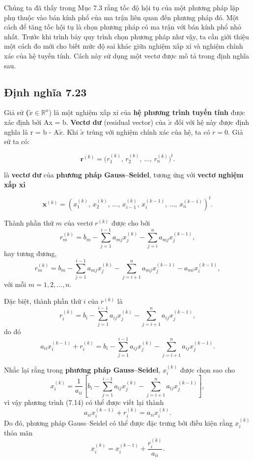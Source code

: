 Chúng ta đã thấy trong Mục 7.3 rằng tốc độ hội tụ của một phương pháp lặp phụ thuộc vào bán kính phổ của ma trận liên quan đến phương pháp đó. Một cách để tăng tốc hội tụ là chọn phương pháp có ma trận với bán kính phổ nhỏ nhất. Trước khi trình bày quy trình chọn phương pháp như vậy, ta cần giới thiệu một cách đo mới cho biết mức độ sai khác giữa nghiệm xấp xỉ và nghiệm chính xác của hệ tuyến tính. Cách này sử dụng một vectơ được mô tả trong định nghĩa sau.

\subsection*{Định nghĩa 7.23}
Giả sử \textbf(\( \tilde{x} \in \mathbb{R}^n \)) là một nghiệm xấp xỉ của \textbf{hệ phương trình tuyến tính} được xác định bởi Ax = b.
\textbf{Vectơ dư} (residual vector) của \( \tilde{x} \) đối với hệ này được định nghĩa là r = b - A\( \tilde{x} \). Khi \( \tilde{x} \) trùng với nghiệm chính xác của hệ, ta có \( r = 0 \). Giả sử ta có:

\[
\mathbf{r}^{(k)} = \bigl(r^{(k)}_{1},\, r^{(k)}_{2},\, \ldots,\, r^{(k)}_{n}\bigr)^{t}.
\]

là \textbf{vectơ dư} của \textbf{phương pháp Gauss--Seidel}, tương ứng với \textbf{vectơ nghiệm xấp xỉ}

\[
\mathbf{x}^{(k)} = (x^{(k)}_1,\, x^{(k)}_2,\, \ldots,\, x^{(k)}_{i-1},\, x^{(k-1)}_i,\, \ldots,\, x^{(k-1)}_n)^{t}.
\]

Thành phần thứ \( m \) của vectơ \( r^{(k)} \) được cho bởi
\[
r^{(k)}_m = b_m - \sum_{j=1}^{i-1} a_{mj} x^{(k)}_j - \sum_{j=i}^{n} a_{mj} x^{(k-1)}_j, \tag{7.13}
\]
hay tương đương,
\[
r^{(k)}_m = b_m - \sum_{j=1}^{i-1} a_{mj} x^{(k)}_j - \sum_{j=i+1}^{n} a_{mj} x^{(k-1)}_j - a_{mi}x^{(k-1)}_i,
\]
với mỗi \( m = 1, 2, \ldots, n.\)

Đặc biệt, thành phần thứ \( i \) của \( r^{(k)} \) là
\[
r^{(k)}_i = b_i - \sum_{j=1}^{i-1} a_{ij}x^{(k)}_j - \sum_{j=i+1}^{n} a_{ij}x^{(k-1)}_j,
\]
do đó
\[
a_{ii}x^{(k-1)}_i + r^{(k)}_i = b_i - \sum_{j=1}^{i-1} a_{ij}x^{(k)}_j - \sum_{j=i+1}^{n} a_{ij}x^{(k-1)}_j. \tag{7.14}
\]

Nhắc lại rằng trong \textbf{phương pháp Gauss--Seidel}, \( x^{(k)}_i \) được chọn sao cho
\[
x^{(k)}_i = \frac{1}{a_{ii}}\left[b_i - \sum_{j=1}^{i-1} a_{ij}x^{(k)}_j - \sum_{j=i+1}^{n} a_{ij}x^{(k-1)}_j\right], \tag{7.15}
\]
vì vậy phương trình (7.14) có thể được viết lại thành
\[
a_{ii}x^{(k-1)}_i + r^{(k)}_i = a_{ii}x^{(k)}_i.
\]
Do đó, phương pháp Gauss--Seidel có thể được đặc trưng bởi điều kiện rằng \( x^{(k)}_i \) thỏa mãn
\[
x^{(k)}_i = x^{(k-1)}_i + \frac{r^{(k)}_i}{a_{ii}}. \tag{7.16}
\]

